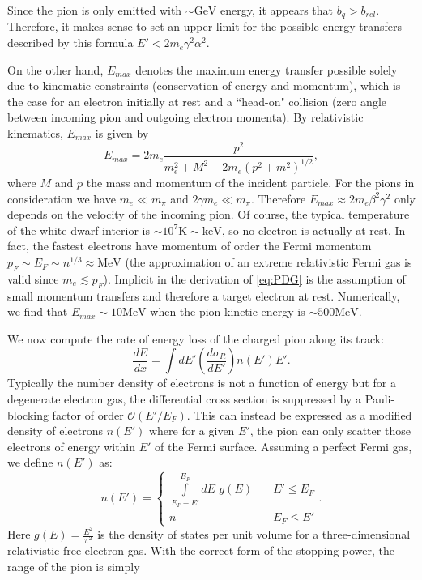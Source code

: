 \documentclass[11 pt, preprint,preprintnumbers,amsmath,amssymb, prd]{revtex4}
\begin{document}
Since the pion is only emitted with $\sim \text{GeV}$ energy, it appears that $b_q > b_{rel}$. Therefore, it makes sense to set an upper limit for the possible energy transfers described by this formula $E' < 2 m_e \gamma^2 \alpha^2$. 

On the other hand, $E_{max}$ denotes the maximum energy transfer possible solely due to kinematic constraints (conservation of energy and momentum), which is the case for an electron initially at rest and a ``head-on" collision (zero angle between incoming pion and outgoing electron momenta). By relativistic kinematics, $E_{max}$ is given by 
\begin{equation}
E_{max} = 2 m_e \frac{p^2}{m_e^2 + M^2 + 2m_e (p^2 +m^2)^{1/2}},
\end{equation}
where $M$ and $p$ the mass and momentum of the incident particle. For the pions in consideration we have $m_e \ll m_\pi$ and $2 \gamma m_e \ll m_\pi$. Therefore $E_{max} \approx 2 m_e \beta^2 \gamma^2$ only depends on the velocity of the incoming pion. Of course, the typical temperature of the white dwarf interior is $\sim 10^{7} \text{K} \sim \text{keV}$, so no electron is actually at rest. In fact, the fastest electrons have momentum of order the Fermi momentum $p_F \sim E_F \sim n^{1/3} \approx \text{MeV}$ (the approximation of an extreme relativistic Fermi gas is valid since $m_e \lesssim p_F$). Implicit in the derivation of \ref{eq:PDG} is the assumption of small momentum transfers and therefore a target electron at rest. Numerically, we find that $E_{max} \sim 10 \text{MeV}$ when the pion kinetic energy is $\sim 500 \text{MeV}$. 


We now compute the rate of energy loss of the charged pion along its track:
\begin{equation}
\label{eq:SP}
\frac{dE}{dx} = \int dE' \left(\frac{d \sigma_R}{dE'}\right) n(E') E'.
\end{equation}
Typically the number density of electrons is not a function of energy but for a degenerate electron gas, the differential cross section is suppressed by a Pauli-blocking factor of order $\mathcal{O}(E'/E_F)$. This can instead be expressed as a modified density of electrons $n(E')$ where for a given $E'$, the pion can only scatter those electrons of energy within $E'$ of the Fermi surface. Assuming a perfect Fermi gas, we define $n(E')$ as:
\begin{equation}
n(E') = \left\{
        \begin{array}{ll}
            \displaystyle \int \limits_{E_F -E'}^{E_F}dE \hspace{4pt} g(E) & \quad E' \leq E_F \\
            n & \quad E_F \leq E'
        \end{array}
    \right..
\end{equation}
Here $g(E) = \frac{E^2}{\pi^2}$ is the density of states per unit volume for a three-dimensional relativistic free electron gas. With the correct form of the stopping power, the range of the pion is simply 
\end{document}
